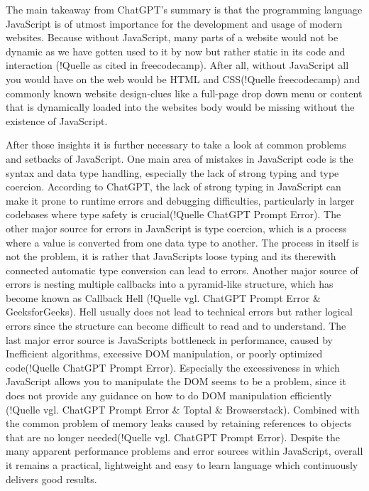 The main takeaway from ChatGPT's summary is that the programming language JavaScript is of utmost importance for the development and usage of modern websites. Because without JavaScript, many parts of a website would not be dynamic as we have gotten used to it by now but rather static in its code and interaction (!Quelle as cited in freecodecamp). After all, without JavaScript \dq all you would have on the web would be HTML and CSS\dq (!Quelle freecodecamp) and commonly known website design-clues like a full-page drop down menu or content that is dynamically loaded into the websites body would be missing without the existence of JavaScript.

After those insights it is further necessary to take a look at common problems and setbacks of JavaScript. One main area of mistakes in JavaScript code is the syntax and data type handling, especially the lack of strong typing and type coercion. According to ChatGPT, the lack of strong typing in JavaScript \dq can make it prone to runtime errors and debugging difficulties, particularly in larger codebases where type safety is crucial\dq (!Quelle ChatGPT Prompt Error). The other major source for errors in JavaScript is type coercion, which is a process where a value is converted from one data type to another. The process in itself is not the problem, it is rather that JavaScripts loose typing and its therewith connected automatic type conversion can lead to errors.
Another major source of errors is nesting multiple callbacks into a pyramid-like structure, which has become known as Callback Hell (!Quelle vgl. ChatGPT Prompt Error \& GeeksforGeeks). Hell usually does not lead to technical errors but rather logical errors since the structure can become difficult to read and to understand. 
The last major error source is JavaScripts bottleneck in performance, caused by \dq Inefficient algorithms, excessive DOM manipulation, or poorly optimized code\dq (!Quelle ChatGPT Prompt Error). Especially the excessiveness in which JavaScript allows you to manipulate the DOM seems to be a problem, since it does not provide any guidance on how to do DOM manipulation efficiently (!Quelle vgl. ChatGPT Prompt Error \& Toptal \& Browserstack). Combined with the common problem of memory leaks caused by \dq retaining references to objects that are no longer needed\dq (!Quelle vgl. ChatGPT Prompt Error).
Despite the many apparent performance problems and error sources within JavaScript, overall it remains a practical, lightweight and easy to learn language which continuously delivers good results.